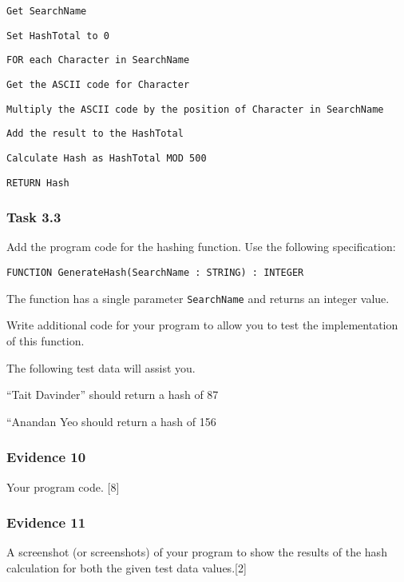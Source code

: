 \noindent\begin{minipage}[t]{1\columnwidth}%
\texttt{Get SearchName}

\texttt{Set HashTotal to 0}

\texttt{FOR each Character in SearchName}

\texttt{\qquad{}Get the ASCII code for Character}

\texttt{\qquad{}Multiply the ASCII code by the position of Character
in SearchName}

\texttt{\qquad{}Add the result to the HashTotal}

\texttt{Calculate Hash as HashTotal MOD 500}

\texttt{RETURN Hash}%
\end{minipage}

\subsubsection*{Task 3.3}

Add the program code for the hashing function. Use the following specification:
\begin{center}
\texttt{FUNCTION GenerateHash(SearchName : STRING) : INTEGER}
\par\end{center}

The function has a single parameter \texttt{SearchName} and returns
an integer value.

Write additional code for your program to allow you to test the implementation
of this function.

The following test data will assist you.

\qquad{}\textquotedblleft Tait Davinder\textquotedblright{} should
return a hash of 87

\qquad{}\textquotedblleft Anandan Yeo\textquotedbl{} should return
a hash of 156

\subsubsection*{Evidence 10}

Your program code. \hfill{}{[}8{]}

\subsubsection*{Evidence 11}

A screenshot (or screenshots) of your program to show the results
of the hash calculation for both the given test data values.\hfill{}{[}2{]}

